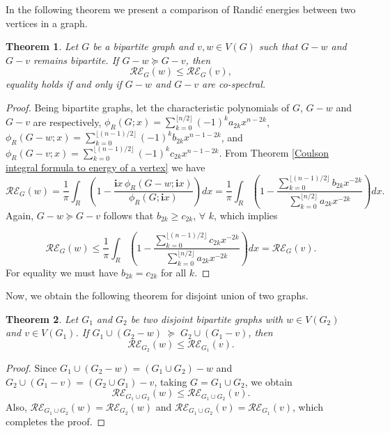 \documentclass[10 pt]{article}
\newtheorem{theorem}{Theorem}[section]
\numberwithin{equation}{section}
\begin{document}
In the following theorem we present a comparison of Randi\'c energies between two vertices in a graph.
\begin{theorem}
Let $G$ be a bipartite graph and $v, w \in V(G)$ such that $G - w$ and $G - v$ remains bipartite. If $G - w \succeq G - v$, then
$$\mathcal{RE}_{G}(w)\leq \mathcal{RE}_{G}(v),$$
equality holds if and only if $G - w$ and  $G - v$ are co-spectral.
\end{theorem}
\begin{proof}
Being bipartite graphs, let the characteristic polynomials of $G$, $G - w$ and $G - v$ are respectively,
$\phi_R(G; x) = \sum\limits_{k =0}^{\lfloor n/2 \rfloor} (-1)^k a_{2k} x^{n-2k}$,
$\phi_R(G - w; x) = \sum\limits_{k=0}^{\lfloor (n-1)/2 \rfloor} (-1)^k b_{2k} x^{n-1-2k}$,
and $\phi_R(G - v; x) = \sum\limits_{k=0}^{\lfloor (n-1)/2 \rfloor} (-1)^k c_{2k} x^{n-1-2k}$. From Theorem \ref{Coulson integral formula to energy of a vertex} we have
$$\mathcal{RE}_{G}(w)= \frac{1}{\pi} \int_{R} \left(1 - \frac{\mathbf{i}x \, \phi_R(G - w; \mathbf{i}x)}{\phi_R(G; \mathbf{i}x)}\right)  dx = \frac{1}{\pi} \int_{R} \left(1 - \frac{\sum\limits_{k = 0}^{\lfloor (n-1)/2 \rfloor} b_{2k} x^{-2k}}{\sum\limits_{k = 0}^{\lfloor n/2 \rfloor} a_{2k} x^{-2k}}\right) dx. $$
Again, $G - w \succeq G - v$ follows that $b_{2k} \geq c_{2k}$, $\forall$ $k$, which implies

$$\mathcal{RE}_{G}(w)\leq \frac{1}{\pi} \int_{R} \left(1 - \frac{\sum\limits_{k = 0}^{\lfloor (n-1)/2 \rfloor} c_{2k} x^{-2k}}{\sum\limits_{k = 0}^{\lfloor n/2 \rfloor} a_{2k} x^{-2k}}\right)  dx = \mathcal{RE}_{G}(v).$$
For equality we must have $b_{2k}= c_{2k}$ for all $k$.
\end{proof}


Now, we obtain the following theorem for disjoint union of two graphs.

\begin{theorem}
Let $G_1$ and $G_2$ be two disjoint bipartite graphs with $w \in V(G_2)$ and $v \in V(G_1)$. If $G_1 \cup (G_2 - w) \;\succeq\; G_2 \cup (G_1 - v)$, then
$$\mathcal{RE}_{G_2}(w)\leq \mathcal{RE}_{G_1}(v).$$
\end{theorem}
\begin{proof}
Since $G_1 \cup (G_2 - w) = (G_1 \cup G_2) - w $ and $G_2 \cup (G_1 - v) = (G_2 \cup G_1) - v$, taking $G = G_1 \cup G_2$, we obtain
$$ \mathcal{RE}_{G_1\cup G_2}(w)\leq \mathcal{RE}_{G_1\cup G_2}(v).$$
Also, $\mathcal{RE}_{G_1 \cup G_2}(w) = \mathcal{RE}_{G_2}(w)$ and $\mathcal{RE}_{G_1 \cup G_2}(v) = \mathcal{RE}_{G_1}(v)$, which completes the proof.
\end{proof}
\end{document}
